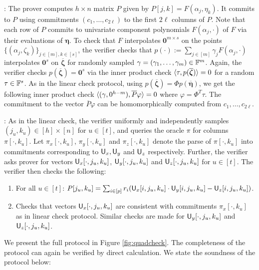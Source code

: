 : The prover computes 
$h\times n$ matrix $P$ given by $P[j,k]=F(\alpha_j,\eta_k)$. It commits to $P$
using commitments $(c_1,\ldots,c_{2\ell})$ to the first $2\ell$ columns of $P$.
Note that each row of $P$ commits to univariate component polynomials
$F(\alpha_j,\cdot)$ of $F$ via their evaluations of $\bm{\eta}$. To check that
$F$ interpolates $\bm{0}^{m\times s}$ on the points
$\{(\alpha_j,\zeta_k)\}_{j\in [m],k\in [s]}$, the verifier checks that
$p(\cdot) := \sum_{j\in [m]}\gamma_jF(\alpha_j,\cdot)$ interpolates $\bm{0}^s$ on
$\overline{\bm{\zeta}}$ for randomly sampled $\gamma=(\gamma_1,\ldots,\gamma_m)\in \mathbb{F}^m$.
Again, the verifier checks $p(\overline{\bm{\zeta}})=\bm{0}^s$ via the inner product
check $\langle \tau,p(\overline{\bm{\zeta}})\rangle=0$ for a random $\tau\in \mathbb{F}^s$. As in the
linear check protocol, using $p(\overline{\bm{\zeta}})=\Phi p(\overline{\bm{\eta}})$, we
get the following inner product check
$\langle (\gamma,0^{h-m}),\overline{P}\varphi\rangle=0$ where $\varphi=\Phi^T\tau$. 
The commitment to the vector $\overline{P}\varphi$ can be homomorphically computed
from $c_1,\ldots,c_{2\ell}$.

: As in the linear check, the
verifier uniformly and independently samples $(j_u,k_u)\in [h]\times [n]$ for
$u\in [t]$, and queries the oracle $\pi$ for columns $\pi[\cdot,k_u]$. Let
$\pi_x[\cdot,k_u]$, $\pi_y[\cdot,k_u]$ and $\pi_z[\cdot,k_u]$ denote the parse
of $\pi[\cdot,k_u]$ into commitments corresponding to $\mathsf{U}_x,\mathsf{U}_y$ and
$\mathsf{U}_z$ respectively. Further, the verifier asks prover for vectors
$\mathsf{U}_x[\cdot,j_u,k_u]$, $\mathsf{U}_y[\cdot,j_u,k_u]$ and $\mathsf{U}_z[\cdot,j_u,k_u]$
for $u\in [t]$. The verifier then checks the following:
\begin{enumerate}[{\rm (i)}]
\item For all $u\in [t]$: $P[j_u,k_u]=\sum_{i\in
[p]}r_i(\mathsf{U}_x[i,j_u,k_u]\cdot\mathsf{U}_y[i,j_u,k_u]-\mathsf{U}_z[i,j_u,k_u])$.
\item Checks that vectors $\mathsf{U}_x[\cdot,j_u,k_u]$ are consistent with
commitments $\pi_x[\cdot,k_u]$ as in linear check protocol. Similar checks are
made for $\mathsf{U}_y[\cdot,j_u,k_u]$ and $\mathsf{U}_z[\cdot,j_u,k_u]$.
\end{enumerate}
We present the full protocol in Figure \ref{fig:quadcheck}. The completeness of
the protocol can again be verified by direct calculation. We state the soundness
of the protocol below:



